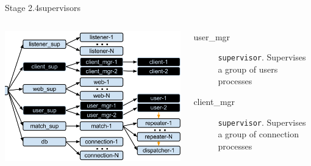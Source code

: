 \documentclass[utf8]{beamer}
\begin{document}
\begin{frame}{Stage 2.4}{supervisors}
	\begin{columns}
			\begin{center}
				\includegraphics[height=.65\textheight]{img/architecture-3-4.png}
			\end{center}
			\begin{description}
				\item[user\_mgr]
					\texttt{supervisor}. Supervises a group of users processes
				\item[client\_mgr]
					\texttt{supervisor}. Supervises a group of connection processes
			\end{description}
	\end{columns}
\end{frame}
\end{document}
